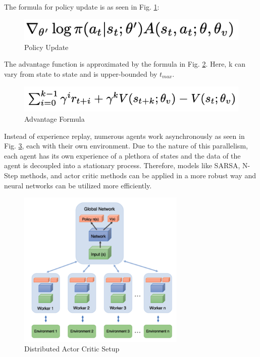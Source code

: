 \documentclass[conference]{IEEEtran}
\begin{document}
The formula for policy update is as seen in Fig. \ref{a3c_policy_update}:

\begin{figure}[h]
  \includegraphics[width=\linewidth]{a3c_loss.png}
  \caption{Policy Update}
  \label{a3c_policy_update}
\end{figure}

The advantage function is approximated by the formula in Fig. \ref{a3c_advantage}. Here, k can vary from state to state and is upper-bounded by $t_{max}$.

\begin{figure}[h]
  \includegraphics[width=\linewidth]{advantage.png}
  \caption{Advantage Formula}
  \label{a3c_advantage}
\end{figure}

Instead of experience replay, numerous agents work asynchronously as seen in Fig. \ref{a3c_multi_worker}, each with their own environment. Due to the nature of this parallelism, each agent has its own experience of a plethora of states and the data of the agent is decoupled into a stationary process. Therefore, models like SARSA, N-Step methods, and actor critic methods can be applied in a more robust way and neural networks can be utilized more efficiently.

\begin{figure}[h]
    \centering
    \includegraphics[width=8cm]{a3c_multi_worker.png}
    \caption{Distributed Actor Critic Setup}
    \label{a3c_multi_worker}
\end{figure}
\end{document}
